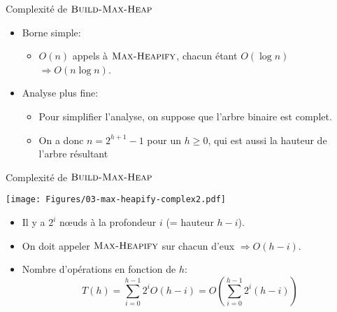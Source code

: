 \begin{frame}{Complexité de $\textnormal{\scshape Build-Max-Heap}$}

\begin{itemize}
\item Borne simple:
\begin{itemize}
\item $O(n)$ appels à $\textnormal{\scshape Max-Heapify}$, chacun étant $O(\log n)$ $\Rightarrow O(n\log n)$.
\end{itemize}

\bigskip


\item Analyse plus fine:
\begin{itemize}
\item Pour simplifier l'analyse, on suppose que l'arbre binaire est complet.
\item On a donc $n=2^{h+1}-1$ pour un $h\geq 0$, qui est aussi la hauteur de l'arbre résultant
\end{itemize}
\end{itemize}


\end{frame}

\begin{frame}{Complexité de $\textnormal{\scshape Build-Max-Heap}$}
\centerline{\texttt{[image: Figures/03-max-heapify-complex2.pdf]}}

\begin{itemize}
\item Il y a $2^i$ n\oe uds à la profondeur $i$ (= hauteur $h-i$).
\item On doit appeler $\textnormal{\scshape Max-Heapify}$ sur chacun d'eux $\Rightarrow O(h-i)$.
\item Nombre d'opérations en fonction de $h$:
$$T(h)=\sum_{i=0}^{h-1} 2^i O(h-i)=O(\sum_{i=0}^{h-1} 2^i (h-i))$$
\end{itemize}
\end{frame}

